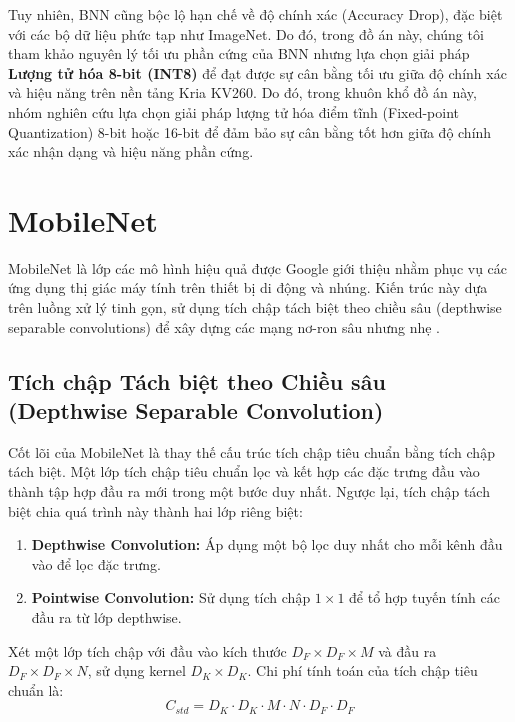 Tuy nhiên, BNN cũng bộc lộ hạn chế về độ chính xác (Accuracy Drop), đặc biệt với các bộ dữ liệu 
phức tạp như ImageNet. Do đó, trong đồ án này, chúng tôi tham khảo nguyên lý tối ưu phần cứng 
của BNN nhưng lựa chọn giải pháp \textbf{Lượng tử hóa 8-bit (INT8)} để đạt được sự cân bằng tối ưu 
giữa độ chính xác và hiệu năng trên nền tảng Kria KV260. Do đó, trong khuôn khổ đồ án này, 
nhóm nghiên cứu lựa chọn giải pháp lượng tử hóa điểm tĩnh (Fixed-point Quantization) 8-bit hoặc 16-bit 
để đảm bảo sự cân bằng tốt hơn giữa độ chính xác nhận dạng và hiệu năng phần cứng.


\section{MobileNet}
\label{sec:mobilenet}

MobileNet là lớp các mô hình hiệu quả được Google giới thiệu nhằm phục vụ các ứng dụng thị giác máy tính 
trên thiết bị di động và nhúng. Kiến trúc này dựa trên luồng xử lý tinh gọn, sử dụng tích chập tách biệt 
theo chiều sâu (depthwise separable convolutions) để xây dựng các mạng nơ-ron sâu 
nhưng nhẹ \cite{mobilenet_v1}.

\subsection{Tích chập Tách biệt theo Chiều sâu (Depthwise Separable Convolution)}
Cốt lõi của MobileNet là thay thế cấu trúc tích chập tiêu chuẩn bằng tích chập tách biệt. 
Một lớp tích chập tiêu chuẩn lọc và kết hợp các đặc trưng đầu vào thành tập hợp đầu ra mới 
trong một bước duy nhất. Ngược lại, tích chập tách biệt chia quá trình này thành 
hai lớp riêng biệt:
\begin{enumerate}
    \item \textbf{Depthwise Convolution:} Áp dụng một bộ lọc duy nhất cho mỗi kênh đầu vào 
    để lọc đặc trưng.
    \item \textbf{Pointwise Convolution:} Sử dụng tích chập $1 \times 1$ để tổ hợp tuyến 
    tính các đầu ra từ lớp depthwise.
\end{enumerate}

Xét một lớp tích chập với đầu vào kích thước $D_F \times D_F \times M$ và đầu ra $D_F 
\times D_F \times N$, sử dụng kernel $D_K \times D_K$. 
Chi phí tính toán của tích chập tiêu chuẩn là:
\begin{equation}
    C_{std} = D_K \cdot D_K \cdot M \cdot N \cdot D_F \cdot D_F
\end{equation}

